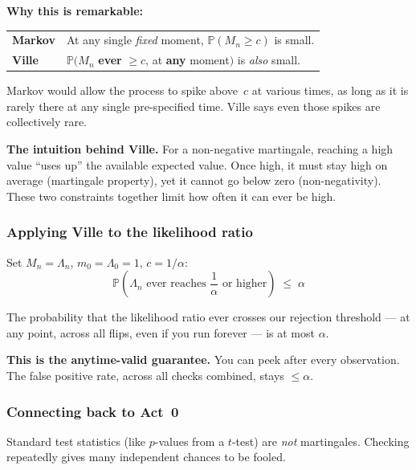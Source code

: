\documentclass[12pt, a4paper]{article}
\newcommand{\Prob}{\mathbb{P}}         %
\newcommand{\LR}{\Lambda}              %
\begin{document}
\textbf{Why this is remarkable:}

\begin{center}
\renewcommand{\arraystretch}{1.3}
\begin{tabular}{@{} l p{9cm} @{}}
\toprule
\textbf{Markov} & At any single \emph{fixed} moment, $\Prob(M_n \geq c)$ is small. \\
\textbf{Ville}  & $\Prob(M_n$ \textbf{ever} $\geq c$, at \textbf{any} moment$)$ is \emph{also} small. \\
\bottomrule
\end{tabular}
\end{center}

Markov would allow the process to spike above~$c$ at various times, as long as
it is rarely there at any single pre-specified time.  Ville says even those
spikes are collectively rare.

\textbf{The intuition behind Ville.}
For a non-negative martingale, reaching a high value ``uses up'' the available
expected value.  Once high, it must stay high on average (martingale property),
yet it cannot go below zero (non-negativity).  These two constraints together
limit how often it can ever be high.

\subsubsection*{Applying Ville to the likelihood ratio}

Set $M_n = \LR_n$, $m_0 = \LR_0 = 1$, $c = 1/\alpha$:
\[
  \boxed{\Prob\!\left(\LR_n \text{ ever reaches } \frac{1}{\alpha}
         \text{ or higher}\right) \;\leq\; \alpha}
\]

\begin{plainlanguage}
The probability that the likelihood ratio ever crosses our rejection
threshold --- at any point, across all flips, even if you run forever ---
is at most $\alpha$.

\textbf{This is the anytime-valid guarantee.}  You can peek after every
observation.  The false positive rate, across all checks combined, stays
$\leq \alpha$.
\end{plainlanguage}

\subsubsection*{Connecting back to Act~0}

Standard test statistics (like $p$-values from a $t$-test) are \emph{not}
martingales.  Checking repeatedly gives many independent chances to be fooled.
\end{document}

